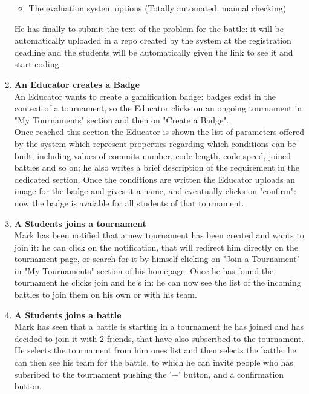 \documentclass{article}
\begin{document}
\begin{enumerate}
\begin{itemize}
    \item The evaluation system options (Totally automated, manual checking)
  \end{itemize}
  He has finally to submit the text of the problem for the battle: it will be automatically uploaded in a repo created by the system at the registration
  deadline and the students will be automatically given the link to see it and start coding.\\
  \newpage
  \item \textbf{An Educator creates a Badge\\}An Educator wants to create a gamification badge: badges exist in the context of a tournament, so the Educator clicks on an ongoing tournament
  in "My Tournaments" section and then on "Create a Badge".\\
  Once reached this section the Educator is shown the list of parameters offered by the system which represent properties regarding which conditions can be built, including values of commits number, code length, code speed, joined battles
  and so on; he also writes a brief description of the requirement in the dedicated section.
  Once the conditions are written the Educator uploads an image for the badge and gives it a name, and eventually clicks on "confirm": now the badge is avaiable for all students of that tournament.\\
  \item \textbf{A Students joins a tournament\\} Mark has been notified that a new tournament has been created and wants to join it: he can click on the notification, that will redirect him directly on the tournament page, or search for it by himself clicking on "Join a Tournament" in "My Tournaments"
  section of his homepage. 
  Once he has found the tournament he clicks join and he's in: he can now see the list of the incoming battles to join them on his own or with his team.\\
  \item \textbf{A Students joins a battle\\} Mark has seen that a battle is starting in a tournament he has joined and has decided to join it with 2 friends, that have also subscribed to the tournament.\\
  He selects the tournament from him ones list and then selects the battle: he can then see his team for the battle, to which he can invite people who has subsribed to the tournament pushing the '+' button, and a confirmation button.\\

\end{enumerate}
\end{document}
